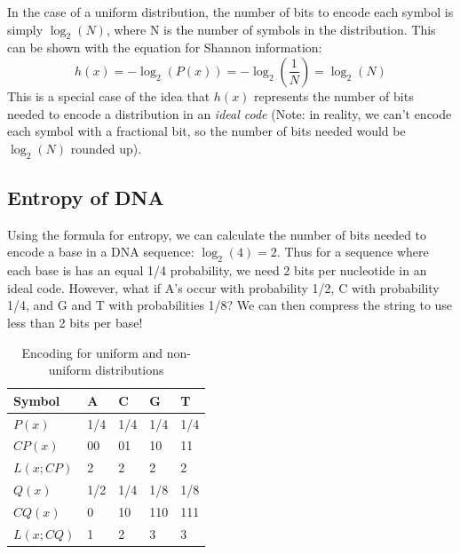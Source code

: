 \documentclass[12pt]{article}
\begin{document}
In the case of a uniform distribution, the number of bits to encode each symbol is simply $\log_2(N)$, where N is the number of symbols in the distribution. This can be shown with the equation for Shannon information:
$$h(x) = -\log_2(P(x)) = -\log_2\left(\frac{1}{N}\right) = \log_2(N)$$
This is a special case of the idea that $h(x)$ represents the number of bits needed to encode a distribution in an \textit{ideal code} (Note: in reality, we can't encode each symbol with a fractional bit, so the number of bits needed would be $\log_2(N)$ rounded up).
\subsection{Entropy of DNA}
Using the formula for entropy, we can calculate the number of bits needed to encode a base in a DNA sequence: $\log_2(4) = 2$. Thus for a sequence where each base is has an equal 1/4 probability, we need 2 bits per nucleotide in an ideal code. However, what if A's occur with probability 1/2, C with probability 1/4, and G and T with probabilities 1/8? We can then compress the string to use less than 2 bits per base!
\begin{table}[h]
\centering
    
    \begin{tabular}{l|llll}
    Symbol    & A   & C   & G   & T   \\ \hline
    $P(x)$    & 1/4 & 1/4 & 1/4 & 1/4 \\
    $CP(x)$   & 00  & 01  & 10  & 11  \\
    $L(x;CP)$ & 2   & 2   & 2   & 2   \\ \hline
    $Q(x)$    & 1/2 & 1/4 & 1/8 & 1/8 \\
    $CQ(x)$   & 0   & 10  & 110 & 111 \\
    $L(x;CQ)$ & 1   & 2   & 3   & 3  
    \end{tabular}
    \caption{Encoding for uniform and non-uniform distributions}
    \label{tab:code}
\end{table}
\end{document}
